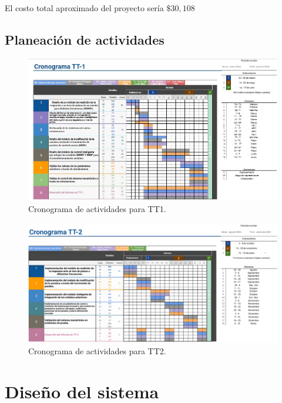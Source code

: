 \documentclass[letterpaper,12pt,oneside]{article}
\begin{document}
El costo total aproximado del proyecto sería $\$30,108$

\subsection*{Planeaci\'on de actividades}
\begin{figure}[!htb]
    \centering
    \includegraphics[width=1\textwidth]{imagenes/Protocolo21.jpg}
    \caption{\footnotesize Cronograma de actividades para TT1.}
\end{figure}
\FloatBarrier

\begin{figure}[!htb]
    \centering
    \includegraphics[width=1\textwidth]{imagenes/Protocolo22.png}
    \caption{\footnotesize Cronograma de actividades para TT2.}
\end{figure}
\FloatBarrier




\section{Diseño del sistema}
\end{document}
